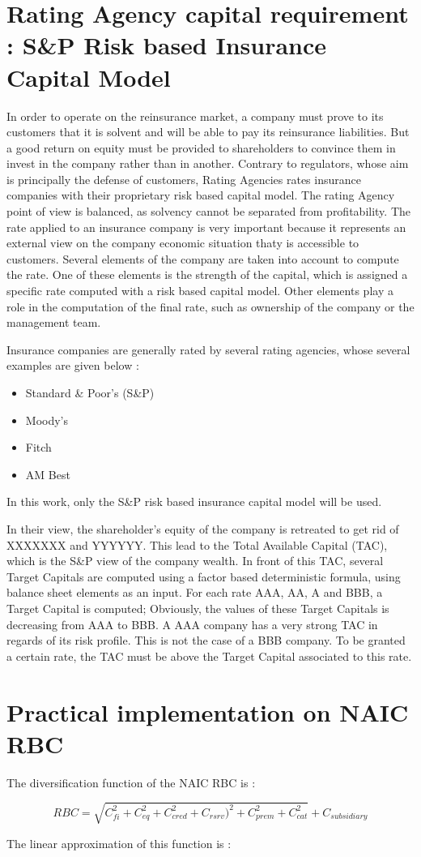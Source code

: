 \section{Rating Agency capital requirement : S\&P Risk based Insurance Capital Model}

In order to operate on the reinsurance market, a company must prove to its customers that it is solvent and will be able to pay its reinsurance liabilities. But a good return on equity must be provided to shareholders to convince them in invest in the company rather than in another. Contrary to regulators, whose aim is principally the defense of customers, Rating Agencies rates insurance companies with their proprietary risk based capital model. The rating Agency point of view is balanced, as solvency cannot be separated from profitability. 
The rate applied to an insurance company is very important because it represents an external view on the company economic situation thaty is accessible to customers.
Several elements of the company are taken into account to compute the rate. One of these elements is the strength of the capital, which is assigned a specific rate computed with a risk based capital model. Other elements play a role in the computation of the final rate, such as ownership of the company or the management team. 

Insurance companies are generally rated by several rating agencies, whose several examples are given below :

\begin{itemize}
\itemsep0em 
\item Standard \& Poor's (S\&P)
\item Moody's
\item Fitch
\item AM Best
\end{itemize}

In this work, only the S\&P risk based insurance capital model will be used.

In their view, the shareholder's equity of the company is retreated to get rid of XXXXXXX and YYYYYY. This lead to the Total Available Capital (TAC), which is the S\&P view of the company wealth. In front of this TAC, several Target Capitals are computed using a factor based deterministic formula, using balance sheet elements as an input. For each rate AAA, AA, A and BBB, a Target Capital is computed; Obviously, the values of these Target Capitals is decreasing from AAA to BBB. A AAA company has a very strong TAC in regards of its risk profile. This is not the case of a BBB company. To be granted a certain rate, the TAC must be above the Target Capital associated to this rate.





\section{Practical implementation on NAIC RBC}


The diversification function of the NAIC RBC is :

\begin{equation}
	RBC = \sqrt{C_{fi}^2 + C_{eq}^2 + C_{cred}^2 + C_{rsrv} )^2 + C_{prem}^2 + C_{cat}^2} + C_{subsidiary}
\end{equation}


The linear approximation of this function is :

